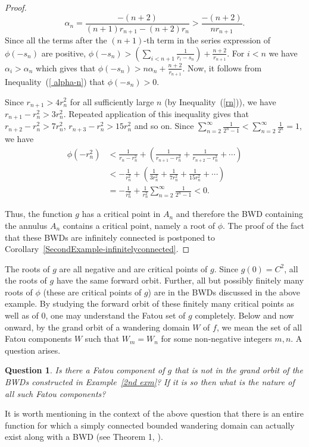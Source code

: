 \documentclass[11pt,a4paper]{article}
\newtheorem{Question}{Question}
\begin{document}
\begin{proof}
\begin{equation} \alpha_{n}=\frac{-(n+2)}{ (n+1)r_{n+1}-(n+2)r_n}> \frac{-(n+2)}{nr_{n+1}}.
\label{ alpha-n}\end{equation}
 Since all the terms after the $(n+1)$-th term in the series   expression of $\phi (-s_n)$ are positive, $\phi(-s_n)>\left( \sum_{i<{n+1}}\frac{1}{r_{i}-s_{n}}\right)+\frac{n+2}{r_{n+1}}$. For $i<n$ we have 	$ \alpha_{i } >  \alpha_{n}$ which gives that $\phi(-s_n)> n \alpha_n + \frac{n+2}{r_{n+1}}.$ Now, it follows from Inequality~(\ref{ alpha-n}) that $\phi(-s_n)>0$.
	 
Since $r_{n+1}>4r^2_n$ for all sufficiently large $n$ (by Inequality~(\ref{rn})), we have  $r_{n+1}-r^2_n>3r^2_n$. Repeated application of this inequality gives that $r_{n+2}-r^2_n>7r^2_n$, $r_{n+3}-r^2_n>15r^2_n$ and so on. Since $\sum_{n=2}^{\infty}\frac{1}{2^n-1}<\sum_{n=2}^{\infty}\frac{1}{2^n}=1$, we have 
	\begin{align*}
		\phi(-r^2_n)&<\frac{1}{r_n-r^2_n}+\left(\frac{1}{r_{n+1}-r^2_n}+\frac{1}{r_{n+2}-r^2_n}+\cdots\right)\\
		&<-\frac{1}{r^2_n}+\left(\frac{1}{3r^2_n}+\frac{1}{7r^2_n}+\frac{1}{15r^2_n}+\cdots\right)\\
		&=-\frac{1}{r^2_n}+\frac{1}{r^2_n}\sum_{n=2}^{\infty}\frac{1}{2^n-1}<0. 
	\end{align*} 

Thus, the function $g$ has a critical point in $A_n$ and therefore the BWD containing the annulus $A_n$ contains a critical point, namely a root of $\phi$. The proof of the fact  that these BWDs are infinitely connected is postponed to Corollary~\ref{SecondExample-infinitelyconnected}. 
\end{proof}
 The roots of $g$ are all negative and are critical points of $g$. Since $g(0)=C^2$, all the roots of $g$ have the same forward orbit. 
Further, all but possibly finitely many roots of $\phi$ (these are critical points of $g$) are in the BWDs discussed in the above example. By studying the forward orbit of these finitely many critical points as well as of $0$, one may understand  the Fatou set of $g$ completely. Below and now onward, by the grand orbit of a wandering domain $W$ of $f$, we mean the set of all Fatou components $W$ such that $W_m =W_n$ for some non-negative integers $m,n$.
 A question  arises.
	\begin{Question}
	Is there a Fatou component of $g$ that is not in the grand orbit of the BWDs constructed in Example~\ref{2nd exm}? If it is so then what is the nature of all such Fatou components? 
	\end{Question}
	It is worth mentioning in the context of the above question that there is an entire function for which a simply connected bounded wandering domain can actually exist along with a BWD (see Theorem 1, \cite{Berg 2010-simply-multiply-wd}).
		
\end{document}
